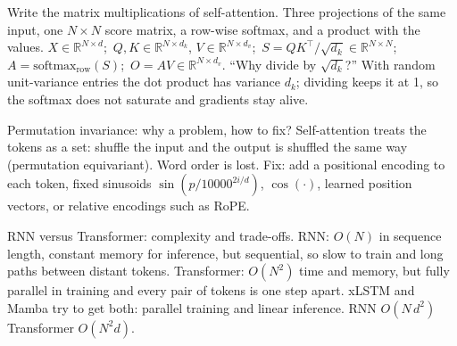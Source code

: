 \begin{qabox}[Klambauer]{\asked Write the matrix multiplications of self-attention.}
\ans Three projections of the same input, one $N\times N$ score matrix, a row-wise softmax, and
a product with the values.
\formula
$X\in\mathbb{R}^{N\times d}$;\ $Q,K\in\mathbb{R}^{N\times d_k}$, $V\in\mathbb{R}^{N\times d_v}$;\
$S=QK^\top/\sqrt{d_k}\in\mathbb{R}^{N\times N}$;\ $A=\mathrm{softmax}_{\text{row}}(S)$;\ $O=AV\in\mathbb{R}^{N\times d_v}$.
\follow ``Why divide by $\sqrt{d_k}$?'' With random unit-variance entries the dot product has
variance $d_k$; dividing keeps it at 1, so the softmax does not saturate and gradients stay alive.
\end{qabox}

\begin{qabox}[Lehner]{\asked Permutation invariance: why a problem, how to fix?}
\ans Self-attention treats the tokens as a set: shuffle the input and the output is shuffled the
same way (permutation equivariant). Word order is lost. Fix: add a positional encoding to each
token, fixed sinusoids $\sin(p/10000^{2i/d})$, $\cos(\cdot)$, learned position vectors, or relative
encodings such as RoPE.
\end{qabox}

\begin{qabox}[Lehner]{\asked RNN versus Transformer: complexity and trade-offs.}
\ans RNN: $O(N)$ in sequence length, constant memory for inference, but sequential, so slow to
train and long paths between distant tokens. Transformer: $O(N^2)$ time and memory, but fully
parallel in training and every pair of tokens is one step apart. xLSTM and Mamba try to get both:
parallel training and linear inference.
\formula RNN $O(N\,d^2)$ \quad Transformer $O(N^2d)$.
\end{qabox}
